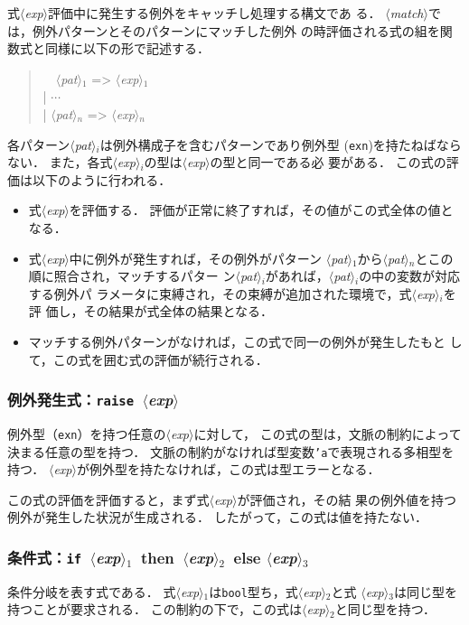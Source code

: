 \documentclass{jbook}
\newcommand{\code}[1]{\mbox{\large\tt #1}}
\newcommand{\nonterm}[1]{\mbox{$\langle$}{\it #1}\mbox{$\rangle$}}
\newcommand{\term}[1]{\mbox{{\tt #1}}}
\newcommand{\myem}{\mbox{\ \ }}
\newenvironment{program}{\begin{quote}\begin{tt}}%
                        {\end{tt}\end{quote}}
\begin{document}
	式\nonterm{exp}評価中に発生する例外をキャッチし処理する構文であ
る．
	\nonterm{match}では，例外パターンとそのパターンにマッチした例外
の時評価される式の組を関数式と同様に以下の形で記述する．
\begin{program}
\myem  \nonterm{pat}$_1$ => \nonterm{exp}$_1$
\\
| $\cdots$
\\
| \nonterm{pat}$_n$ => \nonterm{exp}$_n$
\end{program}
	各パターン\nonterm{pat}$_i$は例外構成子を含むパターンであり例外型
(\code{exn})を持たねばならない．
	また，各式\nonterm{exp}$_i$の型は\nonterm{exp}の型と同一である必
要がある．
	この式の評価は以下のように行われる．
\begin{itemize}
\item 式\nonterm{exp}を評価する．
	評価が正常に終了すれば，その値がこの式全体の値となる．
\item 式\nonterm{exp}中に例外が発生すれば，その例外がパターン
\nonterm{pat}$_1$から\nonterm{pat}$_n$とこの順に照合され，マッチするパター
ン\nonterm{pat}$_i$があれば，\nonterm{pat}$_i$の中の変数が対応する例外パ
ラメータに束縛され，その束縛が追加された環境で，式\nonterm{exp}$_i$を評
価し，その結果が式全体の結果となる．
\item マッチする例外パターンがなければ，この式で同一の例外が発生したもと
して，この式を囲む式の評価が続行される．
\end{itemize}	

\subsubsection{例外発生式：\term{raise}\ \nonterm{exp}}
\label{sec:expression:raise}

	例外型（\code{exn}）を持つ任意の\nonterm{exp}に対して，
この式の型は，文脈の制約によって決まる任意の型を持つ．
	文脈の制約がなければ型変数\code{'a}で表現される多相型を持つ．
	\nonterm{exp}が例外型を持たなければ，この式は型エラーとなる．

	この式の評価を評価すると，まず式\nonterm{exp}が評価され，その結
果の例外値を持つ例外が発生した状況が生成される．
	したがって，この式は値を持たない．
	

\subsubsection{条件式：\term{if}\ \nonterm{exp}$_1$\ then\ \nonterm{exp}$_2$\
else \nonterm{exp}$_3$}

	条件分岐を表す式である．
	式\nonterm{exp}$_1$は\code{bool}型ち，式\nonterm{exp}$_2$と式
\nonterm{exp}$_3$は同じ型を持つことが要求される．
	この制約の下で，この式は\nonterm{exp}$_2$と同じ型を持つ．
	
\end{document}
